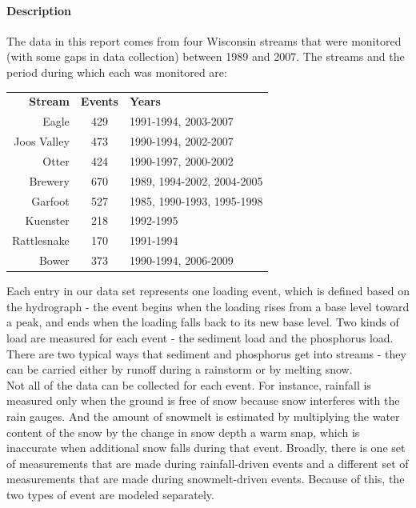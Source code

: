 \documentclass[12pt]{article}
\begin{document}
\paragraph{Description}
The data in this report comes from four Wisconsin streams that were monitored (with some gaps in data collection) between 1989 and 2007. The streams and the period during which each was monitored are:

\begin{table}[h]
\begin{center}
\begin{tabular}{r c l}
        \textbf{Stream}  & \textbf{Events} & \textbf{Years}\\
        Eagle & 429 &1991-1994, 2003-2007\\
        Joos Valley & 473 & 1990-1994, 2002-2007\\
        Otter & 424 & 1990-1997, 2000-2002\\
        Brewery & 670 & 1989, 1994-2002, 2004-2005\\
        Garfoot & 527 & 1985, 1990-1993, 1995-1998\\
        Kuenster & 218 & 1992-1995\\
        Rattlesnake & 170 & 1991-1994\\
        Bower & 373 & 1990-1994, 2006-2009\\
    \end{tabular}
\end{center}
\end{table}

Each entry in our data set represents one loading event, which is defined based on the hydrograph - the event begins when the loading rises from a base level toward a peak, and ends when the loading falls back to its new base level. Two kinds of load are measured for each event - the sediment load and the phosphorus load. There are two typical ways that sediment and phosphorus get into streams - they can be carried either by runoff during a rainstorm or by melting snow.\\

Not all of the data can be collected for each event. For instance, rainfall is measured only when the ground is free of snow because snow interferes with the rain gauges. And the amount of snowmelt is estimated by multiplying the water content of the snow by the change in snow depth a warm snap, which is inaccurate when additional snow falls during that event. Broadly, there is one set of measurements that are made during rainfall-driven events and a different set of measurements that are made during snowmelt-driven events. Because of this, the two types of event are modeled separately.\\
\end{document}
